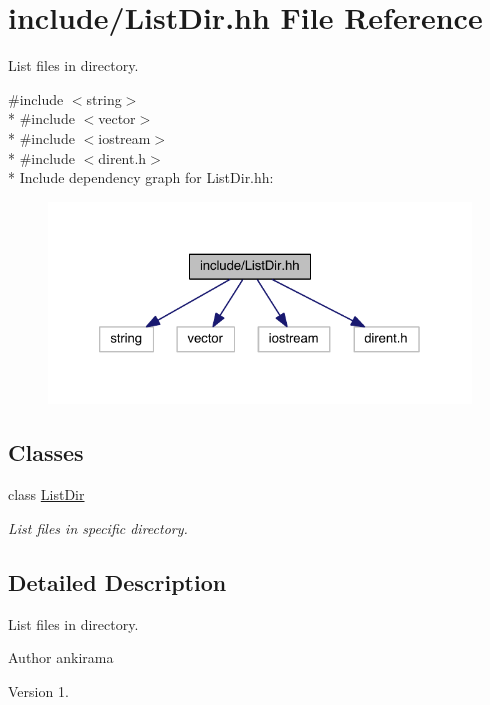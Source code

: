 \hypertarget{_list_dir_8hh}{}\section{include/\+List\+Dir.hh File Reference}
\label{_list_dir_8hh}


List files in directory.  


{\ttfamily \#include $<$string$>$}\\*
{\ttfamily \#include $<$vector$>$}\\*
{\ttfamily \#include $<$iostream$>$}\\*
{\ttfamily \#include $<$dirent.\+h$>$}\\*
Include dependency graph for List\+Dir.\+hh\+:
\nopagebreak
\begin{figure}[H]
\begin{center}
\leavevmode
\includegraphics[width=326pt]{_list_dir_8hh__incl}
\end{center}
\end{figure}
\subsection*{Classes}
\begin{DoxyCompactItemize}
\item 
class \hyperlink{class_list_dir}{List\+Dir}
\begin{DoxyCompactList}\small\item\em List files in specific directory. \end{DoxyCompactList}\end{DoxyCompactItemize}


\subsection{Detailed Description}
List files in directory. 

\begin{DoxyAuthor}{Author}
ankirama 
\end{DoxyAuthor}
\begin{DoxyVersion}{Version}
1. 
\end{DoxyVersion}
